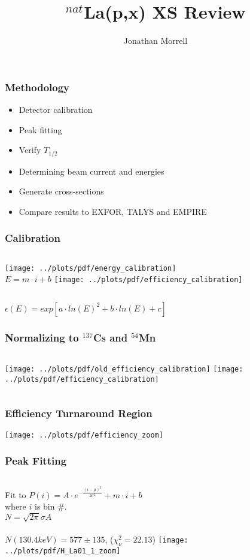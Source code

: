\documentclass[12pt,xcolor=dvipsnames]{beamer}
\author{Jonathan Morrell}
\title{$^{nat}$La(p,x) XS Review}
\begin{document}
\begin{frame}
\titlepage
\end{frame}


\begin{frame}
\frametitle{Methodology}
\begin{itemize}
\item Detector calibration
\item Peak fitting
\item Verify $T_{1/2}$
\item Determining beam current and energies
\item Generate cross-sections
\item Compare results to EXFOR, TALYS and EMPIRE
\end{itemize}
\end{frame}

\begin{frame}
\frametitle{Calibration}
\begin{columns}[c]
\column{1.5in}
\texttt{[image: ../plots/pdf/energy\_calibration]}
\\$E = m\cdot i+b$
\column{2.5in}
\texttt{[image: ../plots/pdf/efficiency\_calibration]}
\end{columns}
$\epsilon (E) = exp[a\cdot ln(E)^2+b\cdot ln(E)+c]$

\end{frame}

\begin{frame}
\frametitle{Normalizing to $^{137}$Cs and $^{54}$Mn}
\begin{columns}[c]
\column{2.25in}
\texttt{[image: ../plots/pdf/old\_efficiency\_calibration]}
\column{2.25in}
\texttt{[image: ../plots/pdf/efficiency\_calibration]}
\end{columns}

\end{frame}

\begin{frame}
\frametitle{Efficiency Turnaround Region}
\texttt{[image: ../plots/pdf/efficiency\_zoom]}
\end{frame}

\begin{frame}
\frametitle{Peak Fitting}
\begin{columns}[c]
\column{1.5in}
Fit to $P(i)=A\cdot e^{-\frac{(i-\mu)^2}{2\sigma^2}} + m\cdot i + b$
\\
where $i$ is bin \#.
\\
$N=\sqrt{2\pi}\sigma A$
\\
\ \ \\
$N(130.4keV) = 577 \pm 135$, ($\chi^2_{\nu}=22.13$)
\column{2.5in}
\texttt{[image: ../plots/pdf/H\_La01\_1\_zoom]}
\end{columns}
\end{frame}
\end{document}
